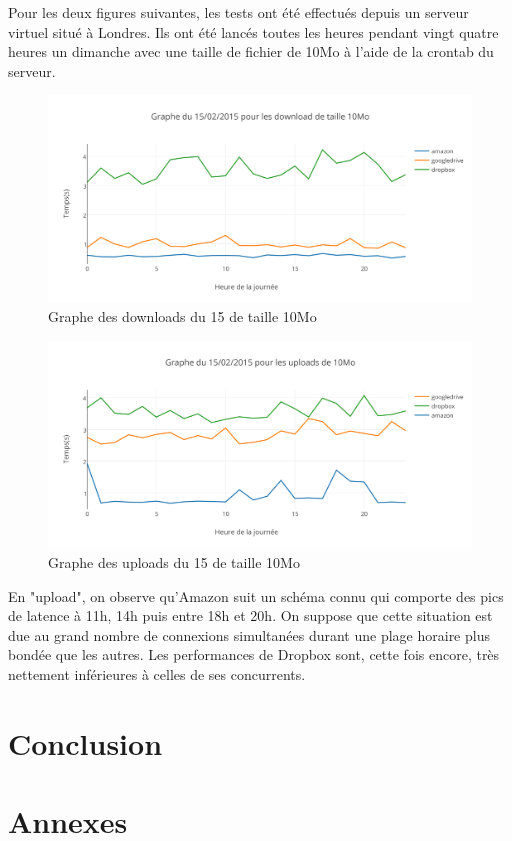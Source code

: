 \documentclass[10pt]{article}
\begin{document}
Pour les deux figures suivantes, les tests ont été effectués depuis un serveur virtuel situé à Londres. Ils ont été lancés toutes les heures pendant vingt quatre heures un dimanche avec une taille de fichier de 10Mo à l'aide de la crontab du serveur.


\begin{figure}[h]
\centering
\includegraphics[scale=0.7]{graphe_du_15022015_pour_les_download_de_taille_10mo.png}
\caption{Graphe des downloads du 15 de taille 10Mo}
\end{figure}

\newpage

\begin{figure}[h]
\centering
\includegraphics[scale=0.7]{graphe_du_15022015_pour_les_uploads_de_10mo.png}
\caption{Graphe des uploads du 15 de taille 10Mo}
\end{figure}


En "upload", on observe qu'Amazon suit un schéma connu qui comporte des pics de latence à 11h, 14h puis entre 18h et 20h. On suppose que cette situation est due au grand nombre de connexions simultanées durant une plage horaire plus bondée que les autres. Les performances de Dropbox sont, cette fois encore, très nettement inférieures à celles de ses concurrents.



\section{Conclusion}

\section{Annexes}
\end{document}
